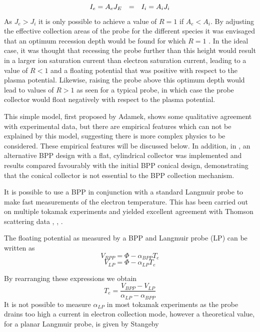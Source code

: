 \begin{equation}
I_e = A_e J_E \hspace{0.25cm}= \hspace{0.25cm} I_i = A_i J_i
\end{equation}
As $J_e > J_i$ it is only possible to achieve a value of $R=1$ if $A_e < A_i$.  By adjusting the effective collection areas of the probe for the different species it was envisaged that an optimum recession depth would be found for which $R=1$ \cite{BPP}. In the ideal case, it was thought that recessing the probe further than this height would result in a larger ion saturation current than electron saturation current, leading to a value of $R<1$ and a floating potential that was positive with respect to the plasma potential. Likewise, raising the probe above this optimum depth would lead to values of $R>1$ as seen for a typical probe, in which case the probe collector would float negatively with respect to the plasma potential.

This simple model, first proposed by Adamek, shows some qualitative agreement with experimental data, but there are empirical features which can not be explained by this model, suggesting there is more complex physics to be considered. These empirical features will be discussed below. In addition, in \cite{BPP_flat}, an alternative BPP design with a flat, cylindrical collector was implemented and results compared favourably with the initial BPP conical design, demonstrating that the conical collector is not essential to the BPP collection mechanism.

 It is possible to use a BPP in conjunction with a standard Langmuir probe to make fast measurements of the electron temperature. This has been carried out on multiple tokamak experiments and yielded excellent agreement with Thomson scattering data \cite{BPP_TE}, \cite{BPP-MAST}, \cite{ISTTOK_te}.

The floating potential as measured by a BPP and Langmuir probe (LP) can be written as 
\begin{equation}
V_{BPP} = \Phi - \alpha_{BPP} T_e
\end{equation}
\begin{equation}
V_{LP} = \Phi - \alpha_{LP} T_e
\end{equation}
 

By rearranging these expressions we obtain
\begin{equation}
T_e = \frac{V_{BPP}-V_{LP}}{\alpha_{LP}-\alpha_{BPP}}
\end{equation}
It is not possible to measure $\alpha_{LP}$ in most tokamak experiments as the probe drains too high a current in electron collection mode, however a theoretical value, for a planar Langmuir probe, is given by Stangeby \cite{stangeby-2000}
  
